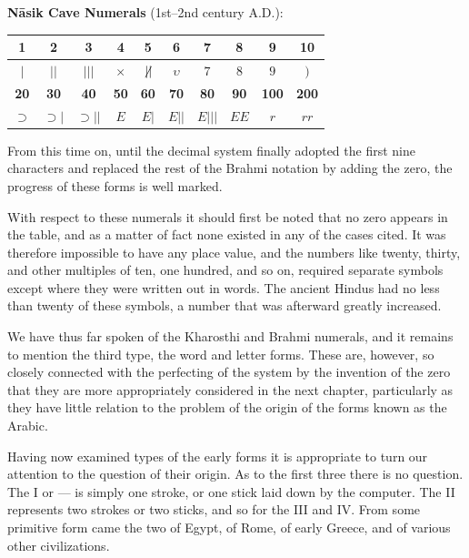 \documentclass[11pt,a4paper]{article}
\newenvironment{enhancednote}{%
  \begin{tcolorbox}[colback=enhancedbg,colframe=notecolor,boxrule=1pt,
    left=10pt,right=10pt,top=8pt,bottom=8pt,
    title={\textbf{Enhanced Edition Note}},fonttitle=\bfseries\color{notecolor}]
}{\end{tcolorbox}}
\begin{document}
\begin{enhancednote}
\textbf{N\=asik Cave Numerals} (1st--2nd century A.D.):

\begin{center}
\begin{tabular}{|*{10}{c|}}
\hline
\textbf{1} & \textbf{2} & \textbf{3} & \textbf{4} & \textbf{5} & \textbf{6} & \textbf{7} & \textbf{8} & \textbf{9} & \textbf{10} \\
\hline
$|$ & $||$ & $|||$ & $\times$ & $\not\!||$ & $\upsilon$ & $7$ & $8$ & $9$ & $)$ \\
\hline
\textbf{20} & \textbf{30} & \textbf{40} & \textbf{50} & \textbf{60} & \textbf{70} & \textbf{80} & \textbf{90} & \textbf{100} & \textbf{200} \\
\hline
$\supset$ & $\supset\!|$ & $\supset\!||$ & $E$ & $E\!|$ & $E\!||$ & $E\!|||$ & $EE$ & $r$ & $rr$ \\
\hline
\end{tabular}
\end{center}
\end{enhancednote}

From this time on, until the decimal system finally adopted the first nine characters and replaced the rest of the Brahmi notation by adding the zero, the progress of these forms is well marked.

With respect to these numerals it should first be noted that no zero appears in the table, and as a matter of fact none existed in any of the cases cited. It was therefore impossible to have any place value, and the numbers like twenty, thirty, and other multiples of ten, one hundred, and so on, required separate symbols except where they were written out in words. The ancient Hindus had no less than twenty of these symbols, a number that was afterward greatly increased.

We have thus far spoken of the Kharosthi and Brahmi numerals, and it remains to mention the third type, the word and letter forms. These are, however, so closely connected with the perfecting of the system by the invention of the zero that they are more appropriately considered in the next chapter, particularly as they have little relation to the problem of the origin of the forms known as the Arabic.

Having now examined types of the early forms it is appropriate to turn our attention to the question of their origin. As to the first three there is no question. The I or --- is simply one stroke, or one stick laid down by the computer. The II represents two strokes or two sticks, and so for the III and IV. From some primitive form came the two of Egypt, of Rome, of early Greece, and of various other civilizations.
\end{document}
